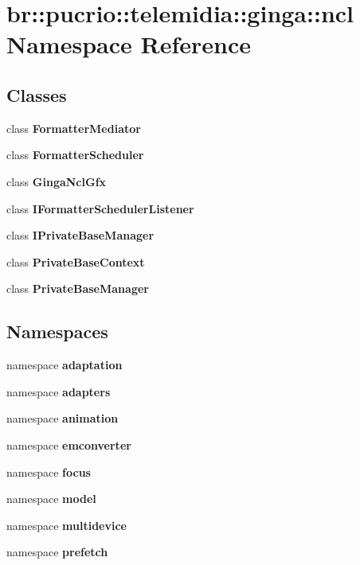 \section{br::pucrio::telemidia::ginga::ncl Namespace Reference}
\label{namespacebr_1_1pucrio_1_1telemidia_1_1ginga_1_1ncl}


\subsection*{Classes}
\begin{CompactItemize}
\item 
class {\bf FormatterMediator}
\item 
class {\bf FormatterScheduler}
\item 
class {\bf GingaNclGfx}
\item 
class {\bf IFormatterSchedulerListener}
\item 
class {\bf IPrivateBaseManager}
\item 
class {\bf PrivateBaseContext}
\item 
class {\bf PrivateBaseManager}
\end{CompactItemize}
\subsection*{Namespaces}
\begin{CompactItemize}
\item 
namespace {\bf adaptation}
\item 
namespace {\bf adapters}
\item 
namespace {\bf animation}
\item 
namespace {\bf emconverter}
\item 
namespace {\bf focus}
\item 
namespace {\bf model}
\item 
namespace {\bf multidevice}
\item 
namespace {\bf prefetch}
\end{CompactItemize}
